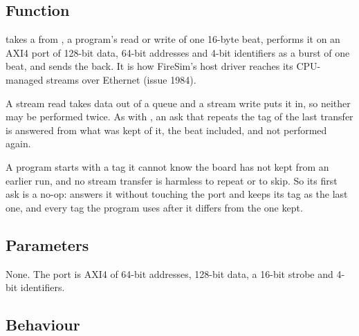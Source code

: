 
%
{}

\subsection*{Function}

 takes a  from , a
program's read or write of one 16-byte beat, performs it on an AXI4
port of 128-bit data, 64-bit addresses and 4-bit identifiers as a burst
of one beat, and sends the  back. It is how FireSim's
host driver reaches its CPU-managed streams over Ethernet (issue 1984).

A stream read takes data out of a queue and a stream write puts it in,
so neither may be performed twice. As with , an ask
that repeats the tag of the last transfer is answered from what was
kept of it, the beat included, and not performed again.

A program starts with a tag it cannot know the board has not kept from
an earlier run, and no stream transfer is harmless to repeat or to skip.
So its first ask is a no-op:  answers it without
touching the port and keeps its tag as the last one, and every tag the
program uses after it differs from the one kept.

\subsection*{Parameters}

None. The port is AXI4 of 64-bit addresses, 128-bit data, a 16-bit
strobe and 4-bit identifiers.


\subsection*{Behaviour}

